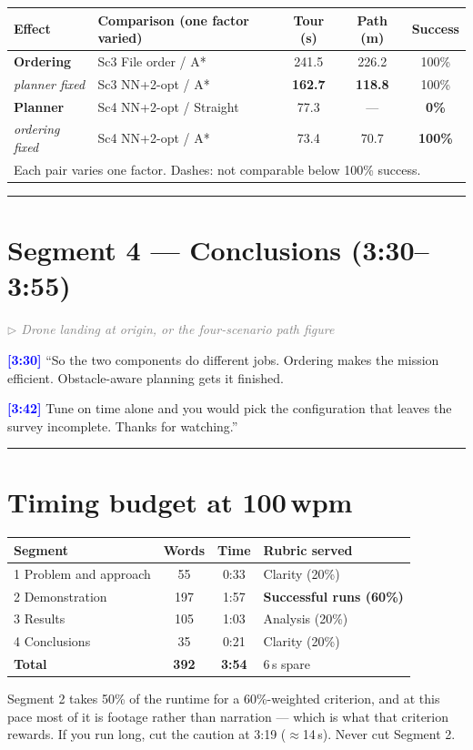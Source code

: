 \documentclass[11pt,a4paper]{article}
\newcommand{\timecode}[1]{\textbf{\textcolor{blue}{[#1]}}}
\newcommand{\cue}[1]{\textit{\textcolor{gray}{$\triangleright$ #1}}}
\begin{document}
\bigskip
\begin{table}[H]
\centering\small
\begin{tabular}{llccc}
\toprule
\textbf{Effect} & \textbf{Comparison (one factor varied)} & \textbf{Tour (s)} & \textbf{Path (m)} & \textbf{Success} \\
\midrule
\textbf{Ordering} & Sc3 \; File order / A* & 241.5 & 226.2 & 100\% \\
\emph{planner fixed} & Sc3 \; NN+2-opt / A* & \textbf{162.7} & \textbf{118.8} & 100\% \\
\midrule
\textbf{Planner} & Sc4 \; NN+2-opt / Straight & 77.3 & --- & \textbf{0\%} \\
\emph{ordering fixed} & Sc4 \; NN+2-opt / A* & 73.4 & 70.7 & \textbf{100\%} \\
\bottomrule
\multicolumn{5}{l}{\footnotesize Each pair varies one factor. Dashes: not comparable below 100\% success.}
\end{tabular}
\end{table}

\bigskip\hrule\bigskip

\section*{Segment 4 --- Conclusions (3:30--3:55)}

\cue{Drone landing at origin, or the four-scenario path figure}

\timecode{3:30}
``So the two components do different jobs. Ordering makes the mission efficient. Obstacle-aware planning gets it finished.

\timecode{3:42}
Tune on time alone and you would pick the configuration that leaves the survey incomplete. Thanks for watching.''

\bigskip\hrule\bigskip

\section*{Timing budget at 100\,wpm}

\begin{table}[H]
\centering\small
\begin{tabular}{lccl}
\toprule
\textbf{Segment} & \textbf{Words} & \textbf{Time} & \textbf{Rubric served} \\
\midrule
1 Problem and approach & 55  & 0:33 & Clarity (20\%) \\
2 Demonstration        & 197 & 1:57 & \textbf{Successful runs (60\%)} \\
3 Results              & 105 & 1:03 & Analysis (20\%) \\
4 Conclusions          & 35  & 0:21 & Clarity (20\%) \\
\midrule
\textbf{Total}         & \textbf{392} & \textbf{3:54} & 6\,s spare \\
\bottomrule
\end{tabular}
\end{table}

\noindent Segment 2 takes 50\% of the runtime for a 60\%-weighted criterion, and at this pace most of it is footage rather than narration --- which is what that criterion rewards. If you run long, cut the caution at 3:19 ($\approx$14\,s). Never cut Segment 2.
\end{document}
